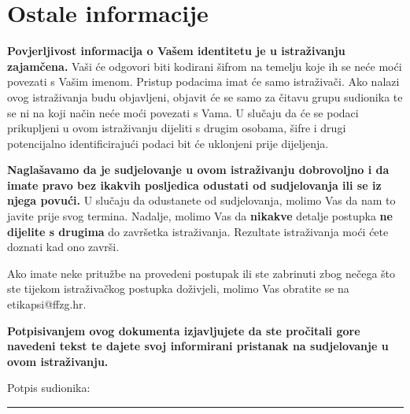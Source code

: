 \documentclass[11pt]{article}
\begin{document}
\section{Ostale informacije}

\textbf{Povjerljivost informacija o Vašem identitetu je u istraživanju
zajamčena.} Vaši će odgovori biti kodirani šifrom na temelju koje ih se neće
moći povezati s Vašim imenom. Pristup podacima imat će samo istraživači. Ako
nalazi ovog istraživanja budu objavljeni, objavit će se samo za čitavu grupu
sudionika te se ni na koji način neće moći povezati s Vama. U slučaju da će se
podaci prikupljeni u ovom istraživanju dijeliti s drugim osobama, šifre i drugi
potencijalno identificirajući podaci bit će uklonjeni prije dijeljenja.

\textbf{Naglašavamo da je sudjelovanje u ovom istraživanju dobrovoljno i da
imate pravo bez ikakvih posljedica odustati od sudjelovanja ili se iz njega
povući.} U slučaju da odustanete od sudjelovanja, molimo Vas da nam to javite
prije svog termina.
Nadalje, molimo Vas da \textbf{nikakve} detalje postupka \textbf{ne dijelite s
drugima} do završetka istraživanja. Rezultate istraživanja moći ćete doznati
kad ono završi.

\vspace{2em}

\noindent Ako imate neke pritužbe na provedeni postupak ili ste
zabrinuti zbog nečega što ste tijekom istraživačkog postupka doživjeli, molimo
Vas obratite se na etikapsi@ffzg.hr.

\vspace{2em}

\noindent \textbf{Potpisivanjem ovog dokumenta izjavljujete da ste pročitali
    gore navedeni tekst te dajete svoj informirani pristanak na sudjelovanje u
ovom istraživanju.} 
\vspace*{5em}

\noindent Potpis sudionika: \rule{6cm}{0.15mm}
\end{document}
